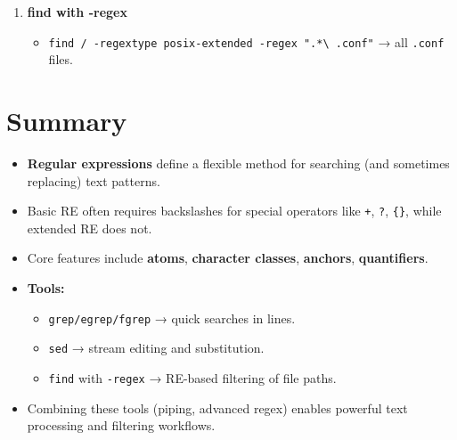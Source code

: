 \documentclass[a4paper]{report}
\begin{document}
\begin{enumerate}
    \item \textbf{find with -regex}
    \begin{itemize}
        \item \texttt{find / -regextype posix-extended -regex "\texttt{.*\textbackslash
        .conf}"} → all \texttt{.conf} files.
    \end{itemize}
\end{enumerate}

\section*{Summary}
\begin{itemize}
    \item \textbf{Regular expressions} define a flexible method for searching (and sometimes replacing) text patterns.
    \item Basic RE often requires backslashes for special operators like \texttt{+}, \texttt{?}, \texttt{\{\}}, while extended RE does not.
    \item Core features include \textbf{atoms}, \textbf{character classes}, \textbf{anchors}, \textbf{quantifiers}.
    \item \textbf{Tools:}
    \begin{itemize}
        \item \texttt{grep/egrep/fgrep} → quick searches in lines.
        \item \texttt{sed} → stream editing and substitution.
        \item \texttt{find} with \texttt{-regex} → RE-based filtering of file paths.
    \end{itemize}
    \item Combining these tools (piping, advanced regex) enables powerful text processing and filtering workflows.
\end{itemize}


\newpage
\end{document}
